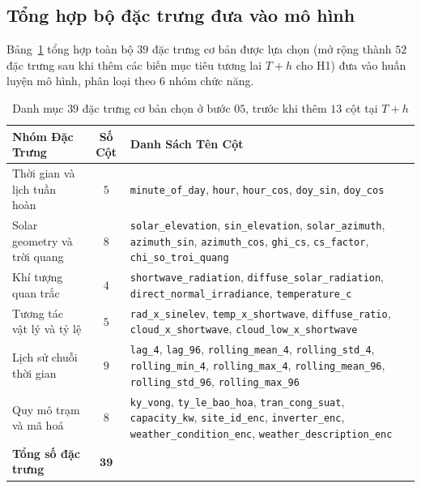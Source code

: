 \documentclass[12pt, a4paper]{report}
\begin{document}
\FloatBarrier
\subsection{Tổng hợp bộ đặc trưng đưa vào mô hình}

Bảng~\ref{tab:bo_dac_trung} tổng hợp toàn bộ $39$ đặc trưng cơ bản được lựa chọn (mở rộng thành $52$ đặc trưng sau khi thêm các biến mục tiêu tương lai $T+h$ cho H1) đưa vào huấn luyện mô hình, phân loại theo 6 nhóm chức năng.

\begin{table}[htbp]
\centering
\caption{Danh mục $39$ đặc trưng cơ bản chọn ở bước $05$, trước khi thêm $13$ cột tại $T{+}h$}
\label{tab:bo_dac_trung}
\footnotesize
\renewcommand{\arraystretch}{1.08}
\begin{tabularx}{\textwidth}{@{} >{\raggedright\arraybackslash}p{3.8cm} c >{\raggedright\arraybackslash}X @{}}
\toprule
\textbf{Nhóm Đặc Trưng} & \textbf{Số Cột} & \textbf{Danh Sách Tên Cột} \\
\midrule
Thời gian và lịch tuần hoàn & $5$ &
\texttt{minute\_of\_day}, \texttt{hour}, \texttt{hour\_cos}, \texttt{doy\_sin}, \texttt{doy\_cos} \\
\addlinespace[3pt]
Solar geometry và trời quang & $8$ &
\texttt{solar\_elevation}, \texttt{sin\_elevation}, \texttt{solar\_azimuth}, \texttt{azimuth\_sin}, \texttt{azimuth\_cos}, \texttt{ghi\_cs}, \texttt{cs\_factor}, \texttt{chi\_so\_troi\_quang} \\
\addlinespace[3pt]
Khí tượng quan trắc & $4$ &
\texttt{shortwave\_radiation}, \texttt{diffuse\_solar\_radiation}, \texttt{direct\_normal\_irradiance}, \texttt{temperature\_c} \\
\addlinespace[3pt]
Tương tác vật lý và tỷ lệ & $5$ &
\texttt{rad\_x\_sinelev}, \texttt{temp\_x\_shortwave}, \texttt{diffuse\_ratio}, \texttt{cloud\_x\_shortwave}, \texttt{cloud\_low\_x\_shortwave} \\
\addlinespace[3pt]
Lịch sử chuỗi thời gian & $9$ &
\texttt{lag\_4}, \texttt{lag\_96}, \texttt{rolling\_mean\_4}, \texttt{rolling\_std\_4}, \texttt{rolling\_min\_4}, \texttt{rolling\_max\_4}, \texttt{rolling\_mean\_96}, \texttt{rolling\_std\_96}, \texttt{rolling\_max\_96} \\
\addlinespace[3pt]
Quy mô trạm và mã hoá & $8$ &
\texttt{ky\_vong}, \texttt{ty\_le\_bao\_hoa}, \texttt{tran\_cong\_suat}, \texttt{capacity\_kw}, \texttt{site\_id\_enc}, \texttt{inverter\_enc}, \texttt{weather\_condition\_enc}, \texttt{weather\_description\_enc} \\
\midrule
\textbf{Tổng số đặc trưng} & $\mathbf{39}$ & \\
\bottomrule
\end{tabularx}


\end{table}
\end{document}
